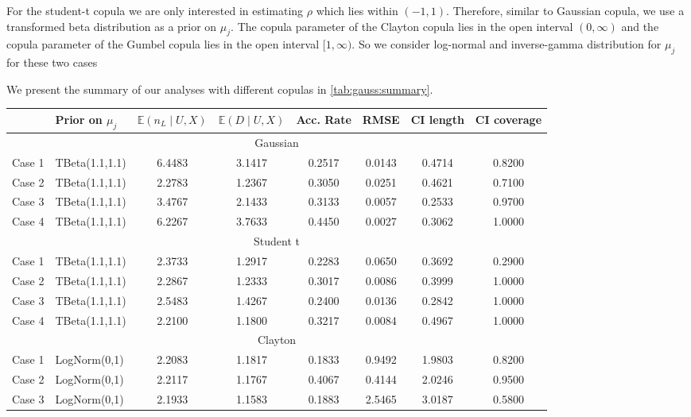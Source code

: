 \documentclass{amsart}
\begin{document}
For the student-t copula we are only interested in estimating $\rho$ which lies within $(-1,1)$. Therefore, similar to Gaussian copula, we use a transformed beta distribution as a prior on $\mu_j$. The copula parameter of the Clayton copula lies in the open interval $(0,\infty)$ and the copula parameter of the Gumbel copula lies in the open interval $[1,\infty)$. So we consider log-normal and inverse-gamma distribution for $\mu_j$ for these two cases

We present the summary of our analyses with different copulas in \cref{tab:gauss:summary}. 

\begin{table}[ht]
	\centering
	\scriptsize{
	\begin{tabular}{ll|cccccc}
		\toprule
		& Prior on $\mu_j$ & $\mathbb{E}(n_L\mid U,X)$ & $\mathbb{E}(D\mid U,X)$ & Acc. Rate & RMSE & CI length & CI coverage \\ 
		\midrule
		\multicolumn{8}{c}{Gaussian} \\
		\midrule
		Case 1 & TBeta(1.1,1.1) & 6.4483 & 3.1417 & 0.2517 & 0.0143 & 0.4714 & 0.8200 \\ 
		Case 2 & TBeta(1.1,1.1) & 2.2783 & 1.2367 & 0.3050 & 0.0251 & 0.4621 & 0.7100 \\ 
		Case 3 & TBeta(1.1,1.1) & 3.4767 & 2.1433 & 0.3133 & 0.0057 & 0.2533 & 0.9700 \\ 
		Case 4 & TBeta(1.1,1.1) & 6.2267 & 3.7633 & 0.4450 & 0.0027 & 0.3062 & 1.0000 \\ 
		\midrule
		\multicolumn{8}{c}{Student t} \\
		\midrule
		Case 1 & TBeta(1.1,1.1) & 2.3733 & 1.2917 & 0.2283 & 0.0650 & 0.3692 & 0.2900 \\ 
		Case 2 & TBeta(1.1,1.1) & 2.2867 & 1.2333 & 0.3017 & 0.0086 & 0.3999 & 1.0000 \\ 
		Case 3 & TBeta(1.1,1.1) & 2.5483 & 1.4267 & 0.2400 & 0.0136 & 0.2842 & 1.0000 \\ 
		Case 4 & TBeta(1.1,1.1) & 2.2100 & 1.1800 & 0.3217 & 0.0084 & 0.4967 & 1.0000 \\ 
		\midrule
		\multicolumn{8}{c}{Clayton} \\
		\midrule
		Case 1 & LogNorm(0,1) & 2.2083 & 1.1817 & 0.1833 & 0.9492 & 1.9803 & 0.8200 \\ 
		Case 2 & LogNorm(0,1) & 2.2117 & 1.1767 & 0.4067 & 0.4144 & 2.0246 & 0.9500 \\ 
		Case 3 & LogNorm(0,1) & 2.1933 & 1.1583 & 0.1883 & 2.5465 & 3.0187 & 0.5800 \\ 

\end{tabular}}
\end{table}
\end{document}
